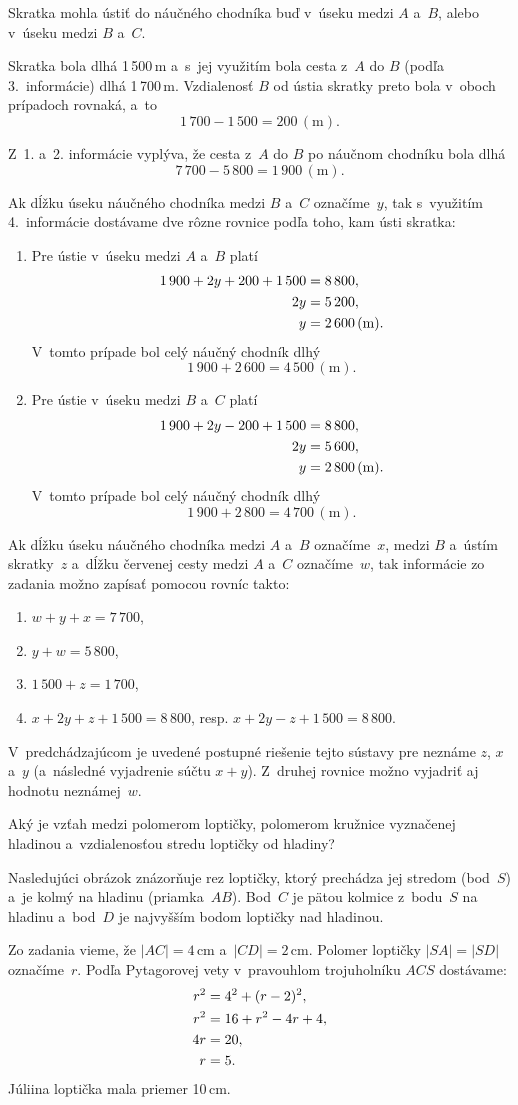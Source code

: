 {%
Skratka mohla ústiť do náučného chodníka buď v~úseku medzi $A$ a~$B$, alebo v~úseku medzi $B$ a~$C$.
%


Skratka bola dlhá 1\,500\,m a~s~jej využitím bola cesta z~$A$ do $B$ (podľa 3.~informácie) dlhá 1\,700\,m.
Vzdialenosť $B$ od ústia skratky preto bola v~oboch prípadoch rovnaká, a~to
$$
1\,700-1\,500=200\,(\text{m}).
$$

Z~1. a~2. informácie vyplýva, že cesta z~$A$ do $B$ po náučnom chodníku bola dlhá
$$
7\,700-5\,800=1\,900\,(\text{m}).
$$

Ak dĺžku úseku náučného chodníka medzi $B$ a~$C$ označíme~$y$, tak s~využitím 4.~informácie dostávame dve rôzne rovnice podľa toho, kam ústi skratka:
\begin{enumerate}\alphatrue
\item Pre ústie v~úseku medzi $A$ a~$B$ platí
$$
\aligned
1\,900+2y+200+1\,500&=8\,800,\\
2y&=5\,200,\\
y&=2\,600\,(\text{m}).
\endaligned
$$
V~tomto prípade bol celý náučný chodník dlhý
$$
1\,900+2\,600=4\,500\,(\text{m}).
$$
\item Pre ústie v~úseku medzi $B$ a~$C$ platí
$$
\aligned
1\,900+2y-200+1\,500&=8\,800,\\
2y&=5\,600,\\
y&=2\,800\,(\text{m}).
\endaligned
$$
V~tomto prípade bol celý náučný chodník dlhý
$$
1\,900+2\,800=4\,700\,(\text{m}).
$$
\end{enumerate}

\poznamka
Ak dĺžku úseku náučného chodníka medzi $A$ a~$B$ označíme~$x$, medzi $B$ a~ústím skratky~$z$ a~dĺžku červenej cesty medzi $A$ a~$C$ označíme~$w$, tak informácie zo zadania možno zapísať pomocou rovníc takto:
\begin{enumerate}
\item $w+y+x=7\,700$,
\item $y+w=5\,800$,
\item $1\,500+z=1\,700$,
\item $x+2y+z+1\,500=8\,800$, resp. $x+2y-z+1\,500=8\,800$.
\end{enumerate}
V~predchádzajúcom je uvedené postupné riešenie tejto sústavy pre neznáme $z$, $x$ a~$y$ (a~následné vyjadrenie súčtu $x+y$).
Z~druhej rovnice možno vyjadriť aj hodnotu neznámej~$w$.
}

{%
\napad
Aký je vzťah medzi polomerom loptičky, polomerom kružnice vyznačenej hladinou a~vzdialenosťou stredu loptičky od hladiny?

\riesenie
Nasledujúci obrázok znázorňuje rez loptičky, ktorý prechádza jej stredom (bod~$S$) a~je kolmý na hladinu (priamka~$AB$).
Bod~$C$ je pätou kolmice z~bodu~$S$ na hladinu a~bod~$D$ je najvyšším bodom loptičky nad hladinou.
%


Zo zadania vieme, že $|AC|=4$\,cm a~$|CD|=2$\,cm.
Polomer loptičky $|SA|=|SD|$ označíme~$r$.
Podľa Pytagorovej vety v~pravouhlom trojuholníku $ACS$ dostávame:
$$
\aligned
r^2&=4^2+(r-2)^2,\\
r^2&=16+r^2-4r+4,\\
4r&=20,\\
r&=5.
\endaligned
$$
Júliina loptička mala priemer 10\,cm.
}

